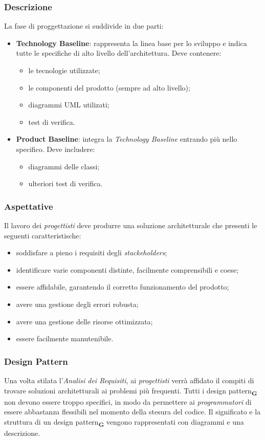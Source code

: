 \subsubsection{Descrizione}
La fase di proggettazione si suddivide in due parti:
\begin{itemize}
    \item\textbf{Technology Baseline}: rappresenta la linea base per lo sviluppo e indica tutte le specifiche di alto livello dell'architettura. Deve contenere:
          \begin{itemize}
              \item le tecnologie utilizzate;
              \item le componenti del prodotto (sempre ad alto livello);
              \item diagrammi UML utilizati;
              \item test di verifica.
          \end{itemize}
    \item\textbf{Product Baseline}: integra la \textit{Technology Baseline} entrando più nello specifico. Deve includere:
          \begin{itemize}
              \item diagrammi delle classi;
              \item ulteriori test di verifica.
          \end{itemize}
\end{itemize}
\subsubsection{Aspettative}
Il lavoro dei \textit{progettisti} deve produrre una soluzione architetturale che presenti le seguenti caratteristische:
\begin{itemize}
    \item soddisfare a pieno i requisiti degli \textit{stackeholders};
    \item identificare varie componenti distinte, facilmente comprensibili e coese;
    \item essere affidabile, garantendo il corretto funzionamento del prodotto;
    \item avere una gestione degli errori robusta;
    \item avere una gestione delle risorse ottimizzata;
    \item essere facilmente manutenibile.
\end{itemize}
\subsubsection{Design Pattern}
Una volta stilata l'\textit{Analisi dei Requisiti}, ai \textit{progettisti} verrà affidato il compiti di trovare soluzioni architetturali ai problemi più frequenti.
Tutti i design pattern\textsubscript{\textbf{G}} non devono essere troppo specifici, in modo da permettere ai \textit{programmatori} di essere abbastanza flessibili nel momento della stesura del codice.
Il significato e la struttura di un design pattern\textsubscript{\textbf{G}} vengono rappresentati con diagrammi e una descrizione.
